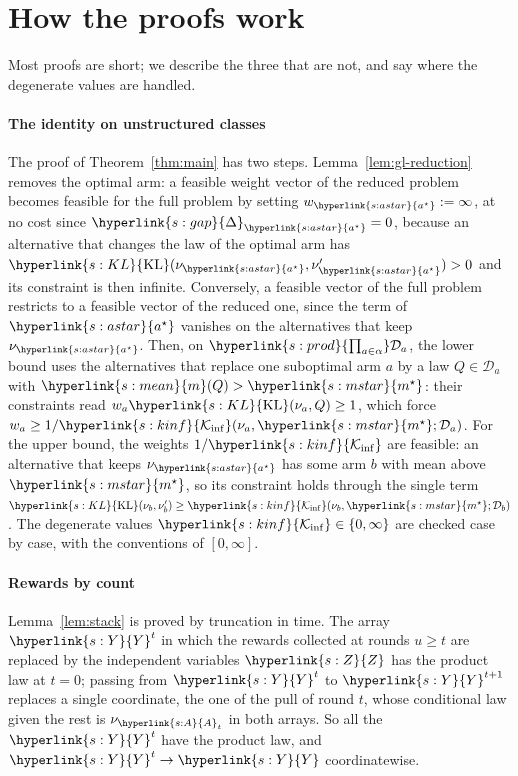 \documentclass[11pt]{article}
\newcommand{\sy}[2]{{\hyperlink{#1}{#2}}}
\newcommand{\mean}{\sy{s:mean}{m}}
\newcommand{\KL}{\sy{s:KL}{\mathrm{KL}}}
\newcommand{\Kinf}{\sy{s:kinf}{\mathcal{K}_{\inf}}}
\newcommand{\ms}{\sy{s:mstar}{m^{\star}}}
\newcommand{\gap}{\sy{s:gap}{\Delta}}
\newcommand{\prodc}[1]{\sy{s:prod}{\textstyle\prod_{a\in\alpha}}#1_{a}}
\newcommand{\Ap}{\sy{s:A}{A}}
\newcommand{\Yc}{\sy{s:Y}{Y}}
\newcommand{\Zc}{\sy{s:Z}{Z}}
\newcommand{\as}{\sy{s:astar}{a^{\star}}}
\begin{document}
\section{How the proofs work}\label{sec:overview}

Most proofs are short; we describe the three that are not, and say where the degenerate values are
handled.

\paragraph{The identity on unstructured classes} The proof of Theorem~\ref{thm:main} has two
steps. Lemma~\ref{lem:gl-reduction} removes the optimal arm: a feasible weight vector of the
reduced problem becomes feasible for the full problem by setting $w_{\as}:=\infty$, at no cost
since $\gap_{\as}=0$, because an alternative that changes the law of the optimal arm has
$\KL(\nu_{\as},\nu'_{\as})>0$ and its constraint is then infinite. Conversely, a feasible vector of
the full problem restricts to a feasible vector of the reduced one, since the term of $\as$ vanishes
on the alternatives that keep $\nu_{\as}$. Then, on $\prodc{\mathcal D}$, the lower bound uses the
alternatives that replace one suboptimal arm $a$ by a law $Q\in\mathcal D_a$ with $\mean(Q)>\ms$:
their constraints read $w_a\KL(\nu_a,Q)\ge1$, which force $w_a\ge1/\Kinf(\nu_a,\ms;\mathcal D_a)$. For
the upper bound, the weights $1/\Kinf$ are feasible: an alternative that keeps $\nu_{\as}$ has some
arm $b$ with mean above $\ms$, so its constraint holds through the single term
$\KL(\nu_b,\nu'_b)\ge\Kinf(\nu_b,\ms;\mathcal D_b)$. The degenerate values $\Kinf\in\{0,\infty\}$ are
checked case by case, with the conventions of $[0,\infty]$.

\paragraph{Rewards by count} Lemma~\ref{lem:stack} is proved by truncation in time. The array
$\Yc^t$ in which the rewards collected at rounds $u\ge t$ are replaced by the independent
variables $\Zc$ has the product law at $t=0$; passing from $\Yc^t$ to $\Yc^{t+1}$ replaces a single
coordinate, the one of the pull of round $t$, whose conditional law given the rest is $\nu_{\Ap_t}$
in both arrays. So all the $\Yc^t$ have the product law, and $\Yc^t\to\Yc$ coordinatewise.
\end{document}
